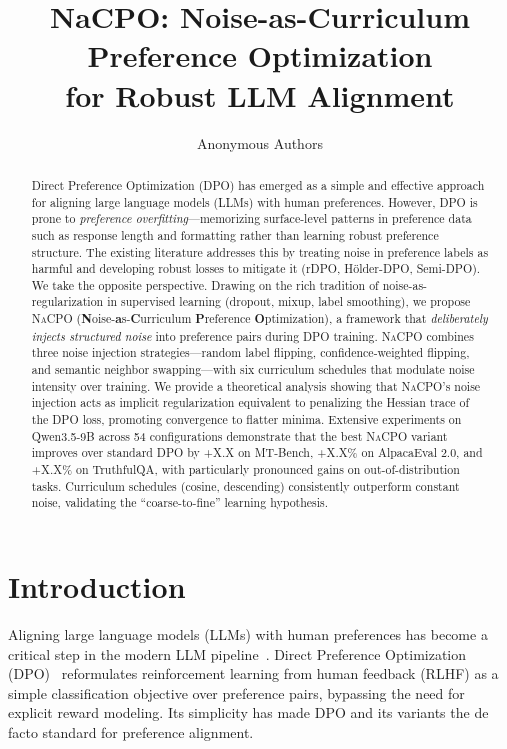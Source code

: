 \documentclass{article}
\title{NaCPO: Noise-as-Curriculum Preference Optimization\\for Robust LLM Alignment}
\author{
  Anonymous Authors
}
\newcommand{\nacpo}{\textsc{NaCPO}}
\newcommand{\dpo}{\textsc{DPO}}
\begin{document}
\maketitle

\begin{abstract}
Direct Preference Optimization (DPO) has emerged as a simple and effective approach for aligning large language models (LLMs) with human preferences.
However, DPO is prone to \emph{preference overfitting}---memorizing surface-level patterns in preference data such as response length and formatting rather than learning robust preference structure.
The existing literature addresses this by treating noise in preference labels as harmful and developing robust losses to mitigate it (rDPO, H\"{o}lder-DPO, Semi-DPO).
We take the opposite perspective.
Drawing on the rich tradition of noise-as-regularization in supervised learning (dropout, mixup, label smoothing), we propose \nacpo{} (\textbf{N}oise-\textbf{a}s-\textbf{C}urriculum \textbf{P}reference \textbf{O}ptimization), a framework that \emph{deliberately injects structured noise} into preference pairs during DPO training.
\nacpo{} combines three noise injection strategies---random label flipping, confidence-weighted flipping, and semantic neighbor swapping---with six curriculum schedules that modulate noise intensity over training.
We provide a theoretical analysis showing that \nacpo{}'s noise injection acts as implicit regularization equivalent to penalizing the Hessian trace of the DPO loss, promoting convergence to flatter minima.
Extensive experiments on Qwen3.5-9B across 54 configurations demonstrate that the best \nacpo{} variant improves over standard DPO by +X.X on MT-Bench, +X.X\% on AlpacaEval 2.0, and +X.X\% on TruthfulQA, with particularly pronounced gains on out-of-distribution tasks.
Curriculum schedules (cosine, descending) consistently outperform constant noise, validating the ``coarse-to-fine'' learning hypothesis.
\end{abstract}

\section{Introduction}
\label{sec:intro}

Aligning large language models (LLMs) with human preferences has become a critical step in the modern LLM pipeline~\cite{PLACEHOLDER_ouyang2022training}.
Direct Preference Optimization (\dpo{})~\cite{PLACEHOLDER_rafailov2023direct} reformulates reinforcement learning from human feedback (RLHF) as a simple classification objective over preference pairs, bypassing the need for explicit reward modeling.
Its simplicity has made \dpo{} and its variants the de facto standard for preference alignment.
\end{document}
